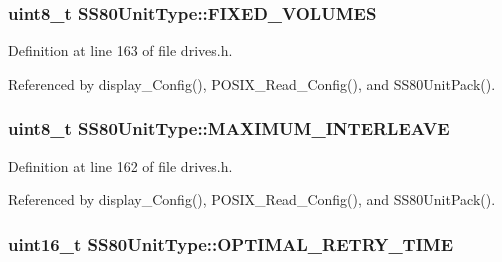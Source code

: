 \subsubsection[{\texorpdfstring{F\+I\+X\+E\+D\+\_\+\+V\+O\+L\+U\+M\+ES}{FIXED_VOLUMES}}]{\setlength{\rightskip}{0pt plus 5cm}uint8\+\_\+t S\+S80\+Unit\+Type\+::\+F\+I\+X\+E\+D\+\_\+\+V\+O\+L\+U\+M\+ES}\hypertarget{structSS80UnitType_ae1d52bfc5a9bdb8f6f26ba6dffd7c2f6}{}\label{structSS80UnitType_ae1d52bfc5a9bdb8f6f26ba6dffd7c2f6}


Definition at line 163 of file drives.\+h.



Referenced by display\+\_\+\+Config(), P\+O\+S\+I\+X\+\_\+\+Read\+\_\+\+Config(), and S\+S80\+Unit\+Pack().

\subsubsection[{\texorpdfstring{M\+A\+X\+I\+M\+U\+M\+\_\+\+I\+N\+T\+E\+R\+L\+E\+A\+VE}{MAXIMUM_INTERLEAVE}}]{\setlength{\rightskip}{0pt plus 5cm}uint8\+\_\+t S\+S80\+Unit\+Type\+::\+M\+A\+X\+I\+M\+U\+M\+\_\+\+I\+N\+T\+E\+R\+L\+E\+A\+VE}\hypertarget{structSS80UnitType_ab215c7a9a84d0d5003a2dcfbd18e4b7d}{}\label{structSS80UnitType_ab215c7a9a84d0d5003a2dcfbd18e4b7d}


Definition at line 162 of file drives.\+h.



Referenced by display\+\_\+\+Config(), P\+O\+S\+I\+X\+\_\+\+Read\+\_\+\+Config(), and S\+S80\+Unit\+Pack().

\subsubsection[{\texorpdfstring{O\+P\+T\+I\+M\+A\+L\+\_\+\+R\+E\+T\+R\+Y\+\_\+\+T\+I\+ME}{OPTIMAL_RETRY_TIME}}]{\setlength{\rightskip}{0pt plus 5cm}uint16\+\_\+t S\+S80\+Unit\+Type\+::\+O\+P\+T\+I\+M\+A\+L\+\_\+\+R\+E\+T\+R\+Y\+\_\+\+T\+I\+ME}\hypertarget{structSS80UnitType_ab7ae848f0a65aa2e29b613bc110c9085}{}\label{structSS80UnitType_ab7ae848f0a65aa2e29b613bc110c9085}


